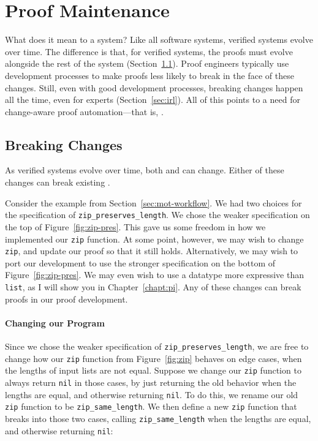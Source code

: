 \section{Proof Maintenance}
\label{sec:mot-mai}

What does it mean to  a  system?
Like all software systems, verified systems evolve over time.
The difference is that, for verified systems, the proofs must evolve alongside the rest of the system (Section~\ref{sec:changes}).
Proof engineers typically use development processes to make proofs less likely to break in the face of these changes.
Still, even with good development processes, breaking changes happen all the time, even for experts (Section~\ref{sec:irl}).
All of this points to a need for change-aware proof automation---that is, .

\subsection{Breaking Changes}
\label{sec:changes}

As verified systems evolve over time, both  and  can change.
Either of these changes can break existing .

Consider the example from Section~\ref{sec:mot-workflow}.
We had two choices for the specification of \lstinline{zip_preserves_length}.
We chose the weaker specification on the top of Figure~\ref{fig:zip-pres}.
This gave us some freedom in how we implemented our \lstinline{zip} function.
At some point, however, we may wish to change \lstinline{zip}, and update our proof so that it still holds.
Alternatively, we may wish to port our development to use the stronger specification on the bottom of Figure~\ref{fig:zip-pres}.
We may even wish to use a datatype more expressive than \lstinline{list}, as I will show you in Chapter~\ref{chapt:pi}.
Any of these changes can break proofs in our proof development.

\paragraph{Changing our Program}

Since we chose the weaker specification of \lstinline{zip_preserves_length},
we are free to change how our \lstinline{zip} function from Figure~\ref{fig:zip} behaves on edge cases,
when the lengths of input lists are not equal.
Suppose we change our \lstinline{zip} function to always return \lstinline{nil} in those cases,
by just returning the old behavior when the lengths are equal, and otherwise returning \lstinline{nil}.
To do this, we rename our old \lstinline{zip} function to be \lstinline{zip_same_length}.
We then define a new \lstinline{zip} function that breaks into those two cases, calling \lstinline{zip_same_length}
when the lengths are equal, and otherwise returning \lstinline{nil}:

